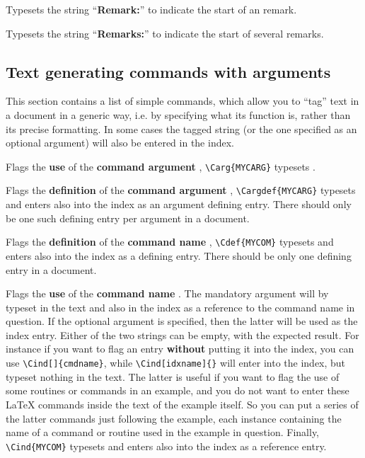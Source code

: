 Typesets the string ``\textbf{Remark:}'' to indicate the start of an remark.

Typesets the string ``\textbf{Remarks:}'' to indicate the start of several remarks.

\subsection{Text generating commands with arguments}

This section contains a list of simple commands, which allow you 
to ``tag'' text in a document in a generic way, i.e. by specifying what
its function is, rather than its precise formatting.
In some cases the tagged string (or the one specified as an optional
argument) will also be entered in the index.


Flags the \textbf{use} of the \textbf{command argument} ,
\eg \verb!\Carg{MYCARG}! typesets .


Flags the \textbf{definition} of the \textbf{command argument} 
,
\eg \verb!\Cargdef{MYCARG}! typesets  and enters 
also into the index as an argument defining entry. 
There should only be one such defining entry per argument in a document.


Flags the \textbf{definition} of the \textbf{command name} ,
\eg \verb!\Cdef{MYCOM}! typesets  and enters 
also into the index as a defining entry. There should be only 
one defining entry in a document.


Flags the \textbf{use} of the \textbf{command name} .
The mandatory argument  will by typeset in the text and also in 
the index as a reference to the command name in question. 
If the optional argument 
is specified, then the latter will be used as the index entry.
Either of the two strings can be empty, with the expected result.
For instance if you want to flag an entry \textbf{without}
putting it into the index, you can use \verb!\Cind[]{cmdname}!,
while \verb!\Cind[idxname]{}! will enter  into the index, but
typeset nothing in the text. 
The latter is useful if you want to flag the use of \eg some routines
or commands in an example, and you do not want to enter
these \LaTeX{} commands inside the text of the example itself.
So you can put a series of the latter commands just following the example,
each instance containing the name of a command or routine used
in the example in question.
Finally, \verb!\Cind{MYCOM}! typesets  
and enters  also into the index as a reference entry.


